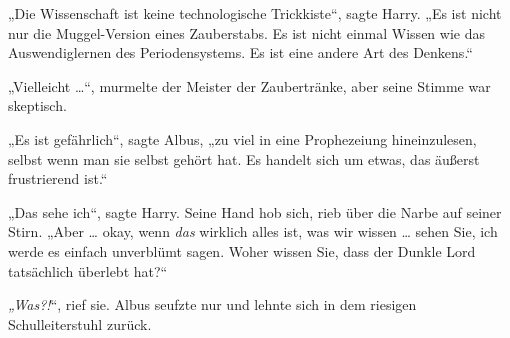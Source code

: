 „Die Wissenschaft ist keine technologische Trickkiste“, sagte Harry.
„Es ist nicht nur die Muggel-Version eines Zauberstabs. Es ist nicht einmal Wissen wie das Auswendiglernen des Periodensystems. Es ist eine andere Art des Denkens.“

„Vielleicht …“, murmelte der Meister der Zaubertränke, aber seine Stimme war skeptisch.

„Es ist gefährlich“, sagte Albus, „zu viel in eine Prophezeiung hineinzulesen, selbst wenn man sie selbst gehört hat. Es handelt sich um etwas, das äußerst frustrierend ist.“

„Das sehe ich“, sagte Harry. Seine Hand hob sich, rieb über die Narbe auf seiner Stirn.
„Aber … okay, wenn \emph{das} wirklich alles ist, was wir wissen … sehen Sie, ich werde es einfach unverblümt sagen. Woher wissen Sie, dass der Dunkle Lord tatsächlich überlebt hat?“

\emph{„Was?!}“, rief sie. Albus seufzte nur und lehnte sich in dem riesigen Schulleiterstuhl zurück.

